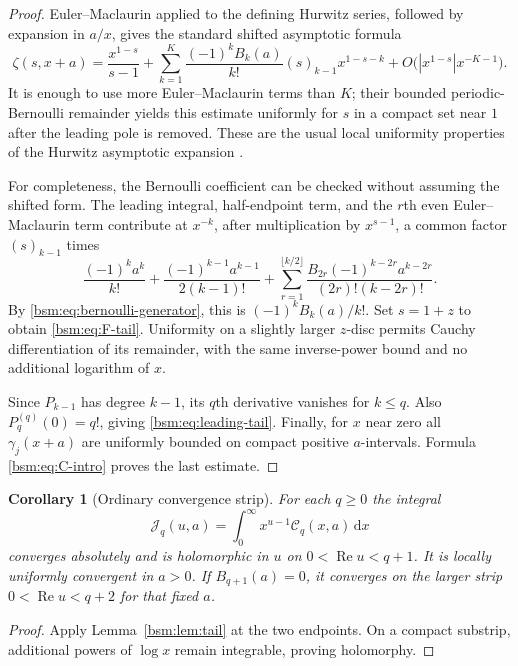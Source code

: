 \documentclass[11pt,letterpaper]{article}
\numberwithin{equation}{section}
\newtheorem{corollary}[theorem]{Corollary}
\theoremstyle{definition}\newtheorem{definition}[theorem]{Definition}
\theoremstyle{remark}\newtheorem{remark}[theorem]{Remark}
\DeclareMathOperator{\Ree}{Re}
\newcommand{\dd}{\,\mathrm{d}}
\newcommand{\Ccal}{\mathcal C}
\newcommand{\Jcal}{\mathcal J}
\begin{document}
\begin{proof}
Euler--Maclaurin applied to the defining Hurwitz series, followed by
expansion in $a/x$, gives the standard shifted asymptotic formula
\[
 \zeta(s,x+a)=\frac{x^{1-s}}{s-1}
 +\sum_{k=1}^{K}\frac{(-1)^k B_k(a)}{k!}(s)_{k-1}x^{1-s-k}
 +O\bigl(|x^{1-s}|x^{-K-1}\bigr).
\]
It is enough to use more Euler--Maclaurin terms than $K$; their bounded
periodic-Bernoulli remainder yields this estimate uniformly for $s$
in a compact set near $1$ after the leading pole is removed. These are
the usual local uniformity properties of the Hurwitz asymptotic
expansion \cite[\S25.11(iii),(xii)]{DLMFHurwitz}.

For completeness, the Bernoulli coefficient can be checked without
assuming the shifted form. The leading integral, half-endpoint term,
and the $r$th even Euler--Maclaurin term contribute at $x^{-k}$,
after multiplication by $x^{s-1}$, a common factor $(s)_{k-1}$ times
\[
 \frac{(-1)^k a^k}{k!}
 +\frac{(-1)^{k-1}a^{k-1}}{2(k-1)!}
 +\sum_{r=1}^{\lfloor k/2\rfloor}
   \frac{B_{2r}(-1)^{k-2r}a^{k-2r}}{(2r)!(k-2r)!}.
\]
By \eqref{bsm:eq:bernoulli-generator}, this is
$(-1)^kB_k(a)/k!$. Set $s=1+z$ to obtain \eqref{bsm:eq:F-tail}.
Uniformity on a slightly larger $z$-disc permits Cauchy differentiation
of its remainder, with the same inverse-power bound and no additional
logarithm of $x$.

Since $P_{k-1}$ has degree $k-1$, its $q$th derivative vanishes for
$k\le q$. Also $P_q^{(q)}(0)=q!$, giving
\eqref{bsm:eq:leading-tail}. Finally, for $x$ near zero all $\gamma_j(x+a)$
are uniformly bounded on compact positive $a$-intervals. Formula
\eqref{bsm:eq:C-intro} proves the last estimate.
\end{proof}

\begin{corollary}[Ordinary convergence strip]\label{bsm:cor:strip}
For each $q\ge0$ the integral
\begin{equation}\label{bsm:eq:J-def}
 \Jcal_q(u,a)=\int_0^\infty x^{u-1}\Ccal_q(x,a)\dd x
\end{equation}
converges absolutely and is holomorphic in $u$ on
$0<\Ree u<q+1$. It is locally uniformly convergent in $a>0$.
If $B_{q+1}(a)=0$, it converges on the larger strip
$0<\Ree u<q+2$ for that fixed $a$.
\end{corollary}
\begin{proof}
Apply Lemma~\ref{bsm:lem:tail} at the two endpoints. On a compact substrip,
additional powers of $\log x$ remain integrable, proving holomorphy.
\end{proof}
\end{document}

